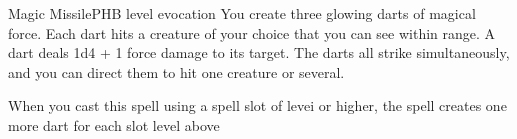 \begin{spell}{Magic Missile}{PHB}{ level evocation}
{
}
You create three glowing darts of magical force. Each
dart hits a creature of your choice that you can see
within range. A dart deals 1d4 + 1 force damage to its
target. The darts all strike simultaneously, and you can
direct them to hit one creature or several.

 When you cast this spell using a
spell slot of  levei or higher, the spell creates one
more dart for each slot level above 
\end{spell}